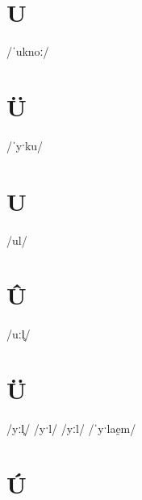 \documentclass[10pt,a4paper,twoside]{book}
\begin{document}
\section*{U}

\begin{multicols}{3}
 {/ˈuknoː/} {}
\end{multicols}

\section*{Ü}

\begin{multicols}{3}
 {/ˈyˑku/} {}
\end{multicols}

\section*{U}

\begin{multicols}{3}
 {/ul/} {}
\end{multicols}

\section*{Û}

\begin{multicols}{3}
 {/uːl̥/} {}
\end{multicols}

\section*{Ü}

\begin{multicols}{3}
 {/yːl̥/} {}
 {/yˑl/} {}
 {/yːl/} {}
 {/ˈyˑlae̯m/} {}
\end{multicols}

\section*{Ú}
\end{document}
